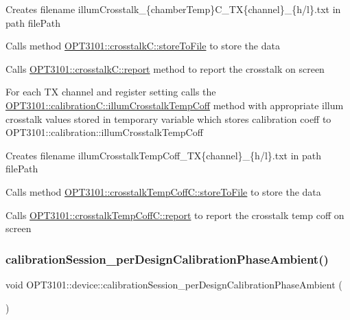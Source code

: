 \begin{DoxyItemize}
\item Creates filename illum\+Crosstalk\+\_\+\{chamber\+Temp\}C\+\_\+\+TX\{channel\}\+\_\+\{h/l\}.txt in path file\+Path
\item Calls method \mbox{\hyperlink{class_o_p_t3101_1_1crosstalk_c_a7d887d736dd5a3aa9dd81224e67240b8}{O\+P\+T3101\+::crosstalk\+C\+::store\+To\+File}} to store the data
\item Calls \mbox{\hyperlink{class_o_p_t3101_1_1crosstalk_c_a8a611602b13d6f3e97049696ddebe209}{O\+P\+T3101\+::crosstalk\+C\+::report}} method to report the crosstalk on screen
\item For each TX channel and register setting calls the \mbox{\hyperlink{class_o_p_t3101_1_1calibration_c_ac7bcc22317965bb378479fb016c20d3c}{O\+P\+T3101\+::calibration\+C\+::illum\+Crosstalk\+Temp\+Coff}} method with appropriate illum crosstalk values stored in temporary variable which stores calibration coeff to O\+P\+T3101\+::calibration\+::illum\+Crosstalk\+Temp\+Coff
\item Creates filename illum\+Crosstalk\+Temp\+Coff\+\_\+\+TX\{channel\}\+\_\+\{h/l\}.txt in path file\+Path
\item Calls method \mbox{\hyperlink{class_o_p_t3101_1_1crosstalk_temp_coff_c_aa24b81ff4f56b9f0f832b57086c87eb8}{O\+P\+T3101\+::crosstalk\+Temp\+Coff\+C\+::store\+To\+File}} to store the data
\item Calls \mbox{\hyperlink{class_o_p_t3101_1_1crosstalk_temp_coff_c_a881ec5ebe971af6c4c4f50e143d64f9a}{O\+P\+T3101\+::crosstalk\+Temp\+Coff\+C\+::report}} to report the crosstalk temp coff on screen 
\end{DoxyItemize}\mbox{\label{class_o_p_t3101_1_1device_a94c4e35aa43bc53eb8fe0d4c364aea25}} 
\subsubsection{\texorpdfstring{calibration\+Session\+\_\+per\+Design\+Calibration\+Phase\+Ambient()}{calibrationSession\_perDesignCalibrationPhaseAmbient()}}
{\footnotesize\ttfamily void O\+P\+T3101\+::device\+::calibration\+Session\+\_\+per\+Design\+Calibration\+Phase\+Ambient (\begin{DoxyParamCaption}{ }\end{DoxyParamCaption})}



